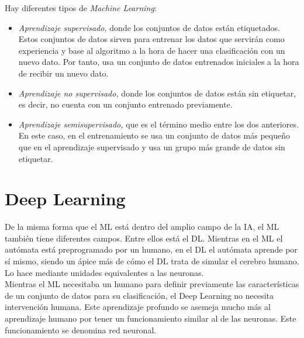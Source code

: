 Hay diferentes tipos de \textit{Machine Learning}:
\begin{itemize}
 \item \textit{Aprendizaje supervisado,} donde los conjuntos de datos están etiquetados. Estos conjuntos de datos sirven para entrenar los datos que servirán como experiencia y base al algoritmo a la hora de hacer una clasificación con un nuevo dato. Por tanto, usa un conjunto de datos entrenados iniciales a la hora de recibir un nuevo dato.
 \item \textit{Aprendizaje no supervisado,} donde los conjuntos de datos están sin etiquetar, es decir, no cuenta con un conjunto entrenado previamente.
 \item \textit{Aprendizaje semisupervisado,} que es el término medio entre los dos anteriores. En este caso, en el entrenamiento se usa un conjunto de datos más pequeño que en el aprendizaje supervisado y usa un grupo más grande de datos sin etiquetar.
\end{itemize}

\section{Deep Learning}
De la misma forma que el ML está dentro del amplio campo de la IA, el ML también tiene diferentes campos. Entre ellos está el DL. Mientras en el ML el autómata está preprogramado por un humano, en el DL el autómata aprende por sí mismo, siendo un ápice más de cómo el DL trata de simular el cerebro humano. Lo hace mediante unidades equivalentes a las neuronas.\\

Mientras el ML necesitaba un humano para definir previamente las características de un conjunto de datos para su clasificación, el Deep Learning no necesita intervención humana. Este aprendizaje profundo se asemeja mucho más al aprendizaje humano por tener un funcionamiento similar al de las neuronas. Este funcionamiento se denomina red neuronal.\\

